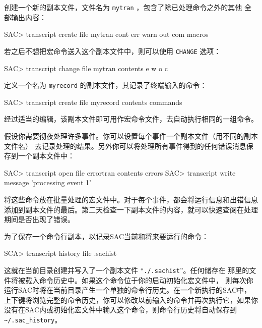 创建一个新的副本文件，文件名为 \texttt{mytran} ，包含了除已处理命令之外的其他
全部输出内容：
\begin{SACCode}
SAC> transcript create file mytran cont err warn out com macros
\end{SACCode}

若之后不想把宏命令送入这个副本文件中，则可以使用 \texttt{CHANGE} 选项：
\begin{SACCode}
SAC> transcript change file mytran contents e w o c
\end{SACCode}

定义一个名为 \texttt{myrecord} 的副本文件，其记录了终端输入的命令：
\begin{SACCode}
SAC> transcript create file myrecord contents commands
\end{SACCode}
经过适当的编辑，该副本文件即可用作宏命令文件，去自动执行相同的一组命令。

假设你需要彻夜处理许多事件。你可以设置每个事件一个副本文件（用不同的副本文件名）
去记录处理的结果。另外你可以将处理所有事件得到的任何错误消息保存到一个副本文件中：
\begin{SACCode}
SAC> transcript open file errortran contents errors
SAC> transcript write message 'processing event 1'
\end{SACCode}
将这些命令放在批量处理的宏文件中。对于每个事件，都会将运行信息和出错信息
添加到副本文件的最后。第二天检查一下副本文件的内容，就可以快速查阅在处理
期间是否出现了错误。

为了保存一个命令行副本，以记录SAC当前和将来要运行的命令：
\begin{SACCode}
SCA> transcript history file .sachist
\end{SACCode}
这就在当前目录创建并写入了一个副本文件 ``\verb|./.sachist|''。任何储存在
那里的文件将被载入命令历史中。如果这个命令位于你的启动初始化宏文件中，
则每次你运行SAC时将在当前目录产生一个单独的命令行历史。在一个新执行的SAC中，
上下键将浏览完整的命令历史，你可以修改以前输入的命令并再次执行它，如果你
没有在SAC内或初始化宏文件中输入这个命令，则命令行历史将自动保存到
\verb|~/.sac_history|。
